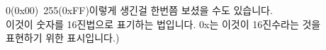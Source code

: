 \documentclass[preview]{standalone}
\begin{document}
\begin{center}
0(0x00)~255(0xFF)이렇게 생긴걸 한번쯤 보셨을 수도 있습니다.\\이것이 숫자를 16진법으로 표기하는 법입니다. 0x는 이것이 16진수라는 것을\\표현하기 위한 표시입니다.)
\end{center}
\end{document}
